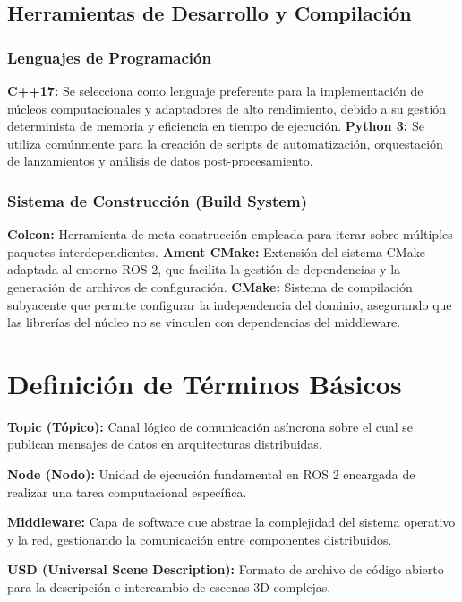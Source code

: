 \subsection{Herramientas de Desarrollo y Compilación}

\subsubsection{Lenguajes de Programación}
\textbf{C++17:} Se selecciona como lenguaje preferente para la implementación de núcleos computacionales y adaptadores de alto rendimiento, debido a su gestión determinista de memoria y eficiencia en tiempo de ejecución.
\textbf{Python 3:} Se utiliza comúnmente para la creación de scripts de automatización, orquestación de lanzamientos y análisis de datos post-procesamiento.

\subsubsection{Sistema de Construcción (Build System)}
\textbf{Colcon:} Herramienta de meta-construcción empleada para iterar sobre múltiples paquetes interdependientes.
\textbf{Ament CMake:} Extensión del sistema CMake adaptada al entorno ROS 2, que facilita la gestión de dependencias y la generación de archivos de configuración.
\textbf{CMake:} Sistema de compilación subyacente que permite configurar la independencia del dominio, asegurando que las librerías del núcleo no se vinculen con dependencias del middleware.

\section{Definición de Términos Básicos}

\textbf{Topic (Tópico):} Canal lógico de comunicación asíncrona sobre el cual se publican mensajes de datos en arquitecturas distribuidas.

\textbf{Node (Nodo):} Unidad de ejecución fundamental en ROS 2 encargada de realizar una tarea computacional específica.

\textbf{Middleware:} Capa de software que abstrae la complejidad del sistema operativo y la red, gestionando la comunicación entre componentes distribuidos.

\textbf{USD (Universal Scene Description):} Formato de archivo de código abierto para la descripción e intercambio de escenas 3D complejas.

